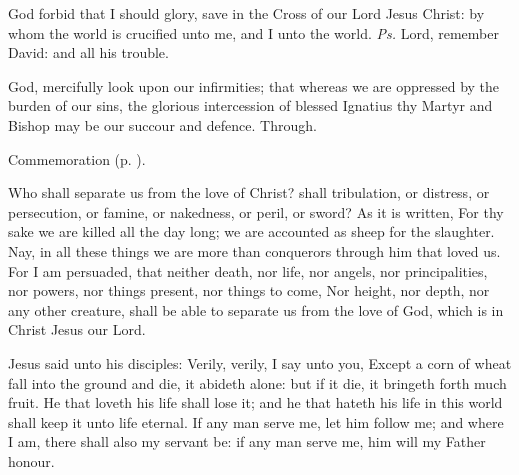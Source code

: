 \introit
{} God forbid that I should glory, save in the Cross of our Lord Jesus Christ: by whom the world is crucified unto me, and I unto the world. \textit{Ps.} Lord, remember David: and all his trouble.

\collect
{} God, mercifully look upon our infirmities; that whereas we are oppressed by the burden of our sins, the glorious intercession of blessed Ignatius thy Martyr and Bishop may be our succour and defence. Through.

\begin{rubric}
    Commemoration  (p. \pageref{BridgetCollect}).
\end{rubric}

 Who shall separate us from the love of Christ? shall tribulation, or distress, or persecution, or famine, or nakedness, or peril, or sword? As it is written, For thy sake we are killed all the day long; we are accounted as sheep for the slaughter. Nay, in all these things we are more than conquerors through him that loved us. For I am persuaded, that neither death, nor life, nor angels, nor principalities, nor powers, nor things present, nor things to come, Nor height, nor depth, nor any other creature, shall be able to separate us from the love of God, which is in Christ Jesus our Lord.


\tractnotice


 Jesus said unto his disciples: Verily, verily, I say unto you, Except a corn of wheat fall into the ground and die, it abideth alone: but if it die, it bringeth forth much fruit. He that loveth his life shall lose it; and he that hateth his life in this world shall keep it unto life eternal. If any man serve me, let him follow me; and where I am, there shall also my servant be: if any man serve me, him will my Father honour.


